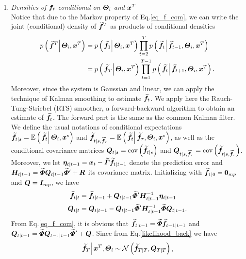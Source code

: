 \begin{enumerate}
\item 
\textit{Densities of $\bm f_t$ conditional on $\bm \varTheta_i$ and $\bm x^T$}\\
Notice that due to the Markov property of Eq.\eqref{eq_f_com}, we can write the joint (conditional) density of $\widetilde{\bm f}^T$ as products of conditional densities
\begin{align}
	p\left(\left.\widetilde{\bm f}^T\right|\bm \varTheta_i,\bm x^T\right)
		&=p\left(\left.\widetilde{\bm f}_1\right|\bm \varTheta_i,\bm x^T\right)
			\prod_{t=2}^Tp\left(\left.\widetilde{\bm f}_t\right|\widetilde{\bm f}_{t-1},\bm \varTheta_i,\bm x^T\right)\\
\label{likelihood_back}
		&=p\left(\left.\widetilde{\bm f}_T\right|\bm \varTheta_i,\bm x^T\right)
			\prod_{t=1}^{T-1}p\left(\left.\widetilde{\bm f}_t\right|\widetilde{\bm f}_{t+1},\bm \varTheta_i,\bm x^T\right).
\end{align}
Moreover, since the system is Gaussian and linear, we can apply the technique of Kalman smoothing to estimate $\widetilde{\bm f}_t$. We apply here the Rauch-Tung-Striebel (RTS) smoother, a forward-backward algorithm to obtain an estimate of $\widetilde{\bm f}_t$. The forward part is the same as the common Kalman filter. We define the usual notations of conditional expectations 
$\widetilde{\bm f}_{t|s}=\mathbb{E}\left(\left.\widetilde{\bm f}_t\right|\bm \varTheta_i,\bm x^s\right)$
and
$\widetilde{\bm f}_{t|s,\widetilde{\bm f}_\tau}=\mathbb{E}\left(\left.\widetilde{\bm f}_t\right|\widetilde{\bm f}_\tau,\bm \varTheta_i,\bm x^s\right)$,
as well as the conditional covariance matrices
$\bm Q_{t|s}=\operatorname{cov}\left(\widetilde{\bm f}_{t|s}\right)$
and
$\bm Q_{t|s,\widetilde{\bm f}_\tau}=\operatorname{cov}\left(\widetilde{\bm f}_{t|s,\widetilde{\bm f}_\tau}\right)$.
Moreover, we let 
$\bm \eta_{t|t-1}=\bm x_t-\widetilde{\bm \varGamma}\widetilde{\bm f}_{t|t-1}$
denote the prediction error and
$\bm H_{t|t-1}=\widetilde{\bm \varPhi}\bm Q_{t|t-1}\widetilde{\bm \varPhi}'+\bm R$
its covariance matrix. Initializing with
$\widetilde{\bm f}_{1|0}=\boldsymbol{0}_{mp}$
and
$\bm Q=\bm I_{mp}$,
we have
\begin{align}
	\widetilde{\bm f}_{t|t}&=\widetilde{\bm f}_{t|t-1}+\bm Q_{t|t-1}\widetilde{\bm \varPhi}'\bm H_{t|t-1}^{-1}\bm \eta_{t|t-1}\\
	\bm Q_{t|t}&=\bm Q_{t|t-1}-\bm Q_{t|t-1}\widetilde{\bm \varPhi}'\bm H_{t|t-1}^{-1}\widetilde{\bm \varPhi}\bm Q_{t|t-1}.
\end{align}
From Eq.\eqref{eq_f_com}, it is obvious that $\widetilde{\bm f}_{t|t-1}=\widetilde{\bm \varPhi}\widetilde{\bm f}_{t-1|t-1}$ and $\bm Q_{t|t-1}=\widetilde{\bm \varPhi}\bm Q_{t-1|t-1}\widetilde{\bm \varPhi}'+\bm Q$. Since from Eq.\eqref{likelihood_back} we have
\begin{align}
\label{eq_f_T_dist}
	\left.\widetilde\vf_T\right|\vx^T,\mTheta_i&\distr\calN\left(\widetilde\vf_{T|T},\mQ_{T|T}\right),\\

\end{align}
\end{enumerate}
